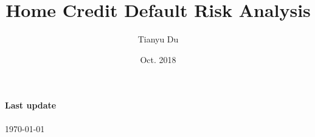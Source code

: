 \documentclass{article}
\title{Home Credit Default Risk Analysis}
\date{Oct. 2018}
\author{Tianyu Du}
\begin{document}
	\maketitle
	\paragraph{Last update} {\today}
\end{document}

